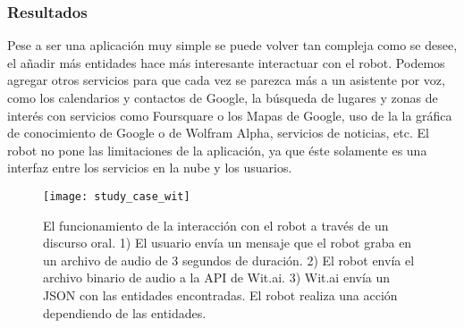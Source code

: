 
\subsubsection{Resultados}

Pese a ser una aplicación muy simple
se puede volver tan compleja como se desee,
el añadir más entidades hace más interesante interactuar con el
robot. Podemos agregar otros servicios para
que cada vez se parezca más a un asistente por voz,
como los calendarios y contactos de Google, la búsqueda de lugares y
zonas de interés con servicios como Foursquare o los Mapas de Google,
uso de la la gráfica de conocimiento de Google o de Wolfram Alpha, 
servicios de noticias, etc. El robot no pone las limitaciones 
de la aplicación, ya que éste solamente es una interfaz
entre los servicios en la nube y los usuarios.

\begin{figure}[htbp]
\centering
\texttt{[image: study\_case\_wit]}
\caption{El funcionamiento de la interacción con el robot a través de un discurso
oral. 1) El usuario envía un mensaje que el robot graba en un archivo de audio de 3 segundos de duración. 2) El robot envía el archivo binario de audio
a la API de Wit.ai. 3) Wit.ai envía un JSON con las entidades encontradas. El robot realiza una acción dependiendo de las entidades.}
\end{figure}

